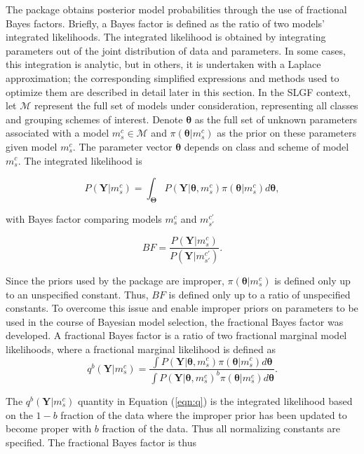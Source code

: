 The  package obtains posterior model probabilities through the use of fractional Bayes factors. Briefly, a Bayes factor is defined as the ratio of two models' integrated likelihoods. The integrated likelihood is obtained by integrating parameters out of the joint distribution of data and parameters. In some cases, this integration is analytic, but in others, it is undertaken with a Laplace approximation; the corresponding simplified expressions and   methods used to optimize them are described in detail later in this section. In the SLGF context, let $\mathcal{M}$ represent the full set of models under consideration, representing all classes and grouping schemes of interest. Denote $\boldsymbol{\theta}$ as the full set of unknown parameters associated with a model $m_s^c\in \mathcal{M}$ and $\pi(\boldsymbol{\theta}|m_s^c)$ as the prior on these parameters given model $m_s^c$.  The parameter vector $\boldsymbol{\theta}$ depends on class and scheme of model $m_s^c$. The integrated likelihood is

$$P(\boldsymbol{Y}|m_s^c)=\int_{{\boldsymbol{\Theta}}} P(\boldsymbol{Y}|\boldsymbol{\theta},m_s^c)\pi(\boldsymbol{\theta}|m_s^c)d\boldsymbol{\theta},$$

\noindent
with Bayes factor comparing models $m_s^c$ and $m_{s'}^{c'}$

$$BF=\frac{P(\boldsymbol{Y}|m_s^c)}{P(\boldsymbol{Y}|m_{s'}^{c'})}.$$

Since the priors used by the  package are improper, $\pi(\boldsymbol{\theta}|m_s^c)$ is defined only up to an unspecified constant. Thus, $BF$ is defined only up to a ratio of unspecified constants. To overcome this issue and enable improper priors on parameters to be used in the course of Bayesian model selection, the fractional Bayes factor \citep{OHaganfbfs} was developed. A fractional Bayes factor is a ratio of two fractional marginal model likelihoods, where a fractional marginal likelihood is defined as
\begin{equation}\label{eqn:q}
q^b(\boldsymbol{Y}|m_s^c)=\frac{\int P(\boldsymbol{Y}|\boldsymbol{\theta},m_s^c)\pi(\boldsymbol{\theta}|m_s^c)d\boldsymbol{\theta}}{\int P(\boldsymbol{Y}|\boldsymbol{\theta},m_s^c)^b\pi(\boldsymbol{\theta}|m_s^c)d\boldsymbol{\theta}}.
\end{equation}

The $q^b(\boldsymbol{Y}|m_s^c)$ quantity in Equation (\ref{eqn:q}) is the integrated likelihood based on the $1-b$ fraction of the data where the improper prior has been updated to become proper with $b$ fraction of the data. Thus all normalizing constants are specified. The fractional Bayes factor is thus

